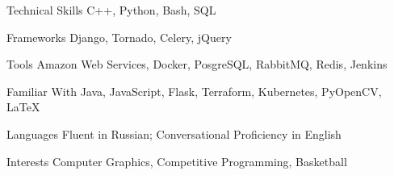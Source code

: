 

\begin{cvskills}
  \cvskill
    {Technical Skills} %
    {C++, Python, Bash, SQL} %

  \cvskill
    {Frameworks} %
    {Django, Tornado, Celery, jQuery} %

  \cvskill
    {Tools} %
    {Amazon Web Services, Docker, PosgreSQL, RabbitMQ, Redis, Jenkins} %

  \cvskill
    {Familiar With} %
    {Java, JavaScript, Flask, Terraform, Kubernetes, PyOpenCV, \LaTeX} %

  \cvskill
    {Languages} %
    {Fluent in Russian; Conversational Proficiency in English} %

  \cvskill
    {Interests} %
    {Computer Graphics, Competitive Programming, Basketball} %
    


\end{cvskills}
